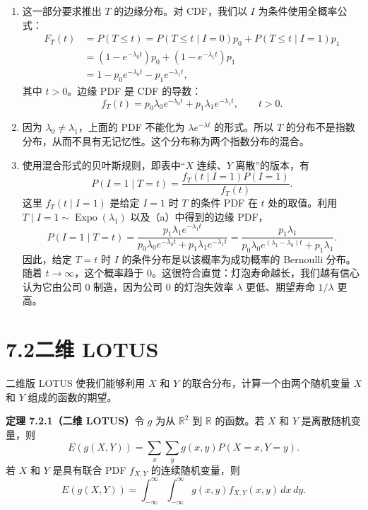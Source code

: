\documentclass[UTF8, 12pt, fontset=fandol, oneside]{ctexart}
\begin{document}
\begin{enumerate}
  \item 这一部分要求推出 $T$ 的边缘分布。对 CDF，我们以 $I$ 为条件使用全概率公式：
  \[
  \begin{aligned}
    F_T(t)&=P(T\le t)=P(T\le t\mid I=0)p_0+P(T\le t\mid I=1)p_1\\
    &=(1-e^{-\lambda_0 t})p_0+(1-e^{-\lambda_1 t})p_1\\
    &=1-p_0e^{-\lambda_0 t}-p_1e^{-\lambda_1 t},
  \end{aligned}
  \]
  其中 $t>0$。边缘 PDF 是 CDF 的导数：
  \[
    f_T(t)=p_0\lambda_0 e^{-\lambda_0 t}+p_1\lambda_1 e^{-\lambda_1 t},\qquad t>0.
  \]

  \item 因为 $\lambda_0\ne\lambda_1$，上面的 PDF 不能化为 $\lambda e^{-\lambda t}$ 的形式。所以 $T$ 的分布不是指数分布，从而不具有无记忆性。这个分布称为两个指数分布的混合。

  \item 使用混合形式的贝叶斯规则，即表中“$X$ 连续、$Y$ 离散”的版本，有
  \[
    P(I=1\mid T=t)=\frac{f_T(t\mid I=1)P(I=1)}{f_T(t)}.
  \]
  这里 $f_T(t\mid I=1)$ 是给定 $I=1$ 时 $T$ 的条件 PDF 在 $t$ 处的取值。利用 $T\mid I=1\sim \operatorname{Expo}(\lambda_1)$ 以及（a）中得到的边缘 PDF，
  \[
    P(I=1\mid T=t)
    =\frac{p_1\lambda_1 e^{-\lambda_1 t}}
    {p_0\lambda_0 e^{-\lambda_0 t}+p_1\lambda_1 e^{-\lambda_1 t}}
    =\frac{p_1\lambda_1}{p_0\lambda_0 e^{(\lambda_1-\lambda_0)t}+p_1\lambda_1}.
  \]
  因此，给定 $T=t$ 时 $I$ 的条件分布是以该概率为成功概率的 Bernoulli 分布。随着 $t\to\infty$，这个概率趋于 $0$。这很符合直觉：灯泡寿命越长，我们越有信心认为它由公司 0 制造，因为公司 0 的灯泡失效率 $\lambda$ 更低、期望寿命 $1/\lambda$ 更高。
\end{enumerate}

\section*{7.2\quad 二维 LOTUS}

二维版 LOTUS 使我们能够利用 $X$ 和 $Y$ 的联合分布，计算一个由两个随机变量 $X$ 和 $Y$ 组成的函数的期望。

\noindent\textbf{定理 7.2.1（二维 LOTUS）}\quad 令 $g$ 为从 $\mathbb{R}^2$ 到 $\mathbb{R}$ 的函数。若 $X$ 和 $Y$ 是离散随机变量，则
\[
  E(g(X,Y))=\sum_x\sum_y g(x,y)P(X=x,Y=y).
\]
若 $X$ 和 $Y$ 是具有联合 PDF $f_{X,Y}$ 的连续随机变量，则
\[
  E(g(X,Y))=\int_{-\infty}^{\infty}\int_{-\infty}^{\infty}
  g(x,y)f_{X,Y}(x,y)\,dx\,dy.
\]
\end{document}
